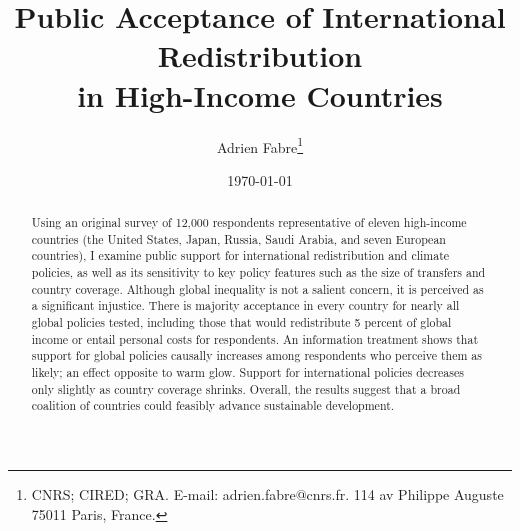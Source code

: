 \documentclass[12pt,english]{article}
\title{Public Acceptance of International Redistribution\\
in High-Income Countries}
\author{Adrien Fabre\footnote{CNRS; CIRED; GRA. E-mail: adrien.fabre@cnrs.fr. 114 av Philippe Auguste 75011 Paris, France.}} %
\date{\today}
\begin{document}
\maketitle

\begin{abstract}

Using an original survey of 12,000 respondents representative of eleven high-income countries (the United States, Japan, Russia, Saudi Arabia, and seven European countries), I examine public support for international redistribution and climate policies, as well as its sensitivity to key policy features such as the size of transfers and country coverage. Although global inequality is not a salient concern, it is perceived as a significant injustice. There is majority acceptance in every country for nearly all global policies tested, including those that would redistribute 5 percent of global income or entail personal costs for respondents. An information treatment shows that support for global policies causally increases among respondents who perceive them as likely; an effect opposite to warm glow. Support for international policies decreases only slightly as country coverage shrinks. Overall, the results suggest that a broad coalition of countries could feasibly advance sustainable development.

\end{abstract}

\end{document}

